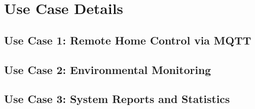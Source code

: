 \section{Use Case Details}

\subsection{Use Case 1: Remote Home Control via MQTT}

\newpage

\subsection{Use Case 2: Environmental Monitoring}

\newpage

\subsection{Use Case 3: System Reports and Statistics}

